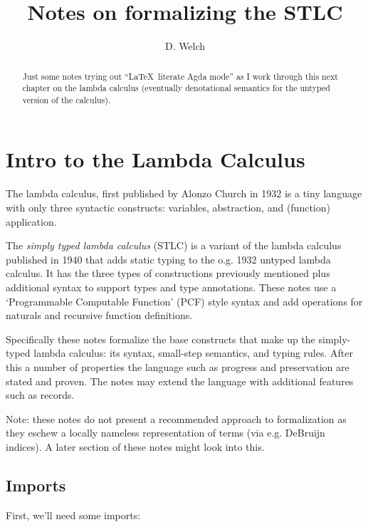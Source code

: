 \documentclass[runningheads]{llncs}
\begin{document}
\title{Notes on formalizing the STLC}
\author{D. Welch}
\institute{}
\maketitle

\begin{abstract}
Just some notes trying out ``\LaTeX \ literate Agda mode'' as I work through 
this next chapter on the lambda calculus (eventually denotational semantics for
the untyped version of the calculus).
\end{abstract}

\section{Intro to the Lambda Calculus} 

The lambda calculus, first published by Alonzo Church in 1932 is a tiny language 
with only three syntactic constructs: variables, abstraction, and (function) 
application. 

The \textit{simply typed lambda calculus} (STLC) is a variant of the lambda 
calculus published in 1940 that adds static typing to the o.g. 1932 untyped 
lambda calculus. It has the three types of constructions previously mentioned 
plus additional syntax to support types and type annotations. These notes use a 
`Programmable Computable Function' (PCF) style syntax and add operations for 
naturals and recursive function definitions.

Specifically these notes formalize the base constructs that make up the 
simply-typed lambda calculus: its syntax, small-step semantics, and typing 
rules. After this a number of properties the language such as progress and 
preservation are stated and proven. The notes may extend the language with 
additional features such as records.

Note: these notes do not present a recommended approach to formalization as 
they eschew a locally nameless representation of terms (via e.g. DeBruijn 
indices). A later section of these notes might look into this. 

\subsection{Imports}

First, we'll need some imports:
\end{document}
